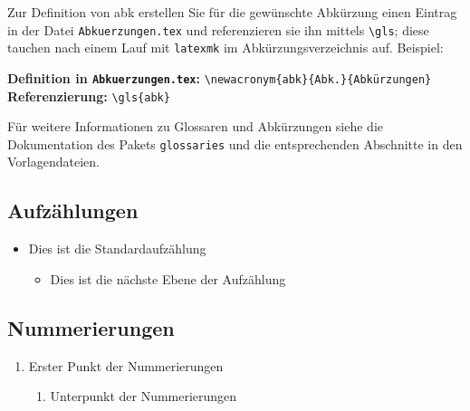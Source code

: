 Zur Definition von \gls{abk} erstellen Sie für die gewünschte Abkürzung einen
Eintrag in der Datei \texttt{Abkuerzungen.tex} und referenzieren sie ihn
mittels \texttt{\textbackslash{}gls}; diese tauchen nach einem Lauf mit
\texttt{latexmk} im Abkürzungsverzeichnis auf. Beispiel:

\vspace{-\baselineskip}

\textbf{Definition in \texttt{Abkuerzungen.tex}:} \texttt{\textbackslash{}newacronym\{abk\}\{Abk.\}\{Abkürzungen\}}\\
\textbf{Referenzierung:} \texttt{\textbackslash{}gls\{abk\}}


Für weitere Informationen zu Glossaren und Abkürzungen siehe die Dokumentation
des Pakets \texttt{glossaries} und die entsprechenden Abschnitte in den
Vorlagendateien.


\subsection[]{Aufzählungen}

\begin{itemize}
\item Dies ist die Standardaufzählung
    \begin{itemize}
    \item Dies ist die nächste Ebene der Aufzählung
    \end{itemize}
\end{itemize}


\subsection[]{Nummerierungen}

\begin{enumerate}
\item Erster Punkt der Nummerierungen
    \begin{enumerate}
    \item Unterpunkt der Nummerierungen
    \end{enumerate}
\end{enumerate}
\clearpage
%
\listoffigures %

\printglossary[type=\acronymtype,title=Abkürzungsverzeichnis] %

\listoftables %

\onehalfspacing


